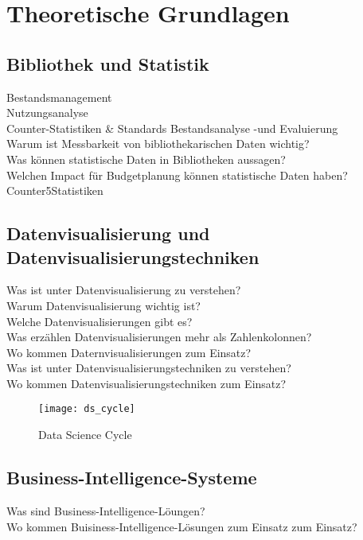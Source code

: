 \chapter{Theoretische Grundlagen}
\label{chap:two}
\section{Bibliothek und Statistik}
\label{chap:two_one}
Bestandsmanagement\\
Nutzungsanalyse\\
Counter-Statistiken \& Standards
Bestandsanalyse -und Evaluierung\\


Warum ist Messbarkeit von bibliothekarischen Daten wichtig?\\
Was können statistische Daten in Bibliotheken aussagen?\\
Welchen Impact für Budgetplanung können statistische Daten haben?\\

Counter5Statistiken
\section{Datenvisualisierung und Datenvisualisierungstechniken}
Was ist unter Datenvisualisierung zu verstehen?\\
Warum Datenvisualisierung wichtig ist?\\
Welche Datenvisualisierungen gibt es?\\
Was erzählen Datenvisualisierungen mehr als Zahlenkolonnen?\\
Wo kommen Daternvisualisierungen zum Einsatz?\\
Was ist unter Datenvisualisierungstechniken zu verstehen?\\
Wo kommen Datenvisualisierungstechniken zum Einsatz?


\begin{figure}[ht]
    \centering
        \texttt{[image: ds\_cycle]}
        \caption{Data Science Cycle}
        \label{fig:data science}
\end{figure}




\section{Business-Intelligence-Systeme}

Was sind Business-Intelligence-Löungen?\\
Wo kommen Buisiness-Intelligence-Lösungen zum Einsatz zum Einsatz?
